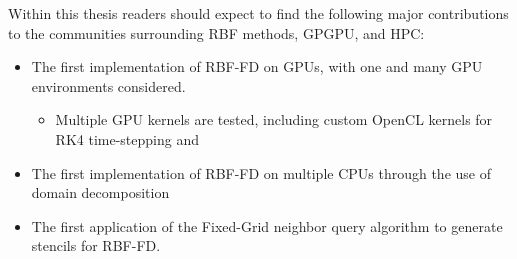 \documentclass[11pt]{report}
\begin{document}
Within this thesis readers should expect to find the following major contributions to the communities surrounding RBF methods, GPGPU, and HPC: 
\begin{itemize} 
\item The first implementation of RBF-FD on GPUs, with one and many GPU environments considered. 
\begin{itemize} 
\item Multiple GPU kernels are tested, including custom OpenCL kernels for RK4 time-stepping and 
\end{itemize} 
\item The first implementation of RBF-FD on multiple CPUs through the use of domain decomposition
\item The first application of the Fixed-Grid neighbor query algorithm to generate stencils for RBF-FD. 
\end{itemize}



\ifstandalone


\end{document}
